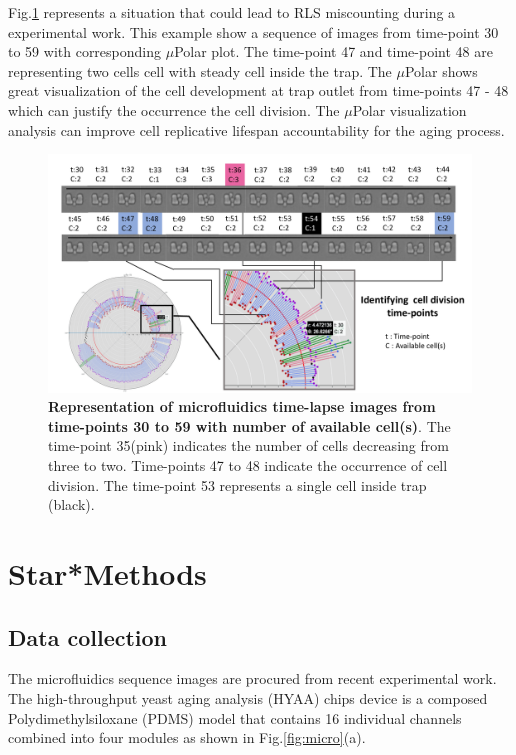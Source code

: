 \documentclass[conference]{IEEEtran}
\begin{document}
Fig.\ref{fig:division} represents a situation that could lead to RLS miscounting during a  experimental work. This example show a sequence of images from time-point 30 to 59 with corresponding $\mu$Polar plot. The time-point 47 and time-point 48 are representing two cells cell with steady cell inside the trap. The $\mu$Polar shows great visualization of the cell development at trap outlet from time-points 47 - 48 which can justify the occurrence the cell division. The $\mu$Polar visualization analysis can improve cell replicative lifespan accountability for the aging process.    

\begin{figure}
\centering
\includegraphics[width=\textwidth,height=10 cm]{Patterns/division.pdf}
\caption{ \textbf{ Representation of microfluidics time-lapse images from time-points 30 to 59 with number of available cell(s)}. The time-point 35(pink) indicates the number of cells decreasing from three to two. Time-points 47 to 48 indicate the occurrence of cell division. The time-point 53 represents a single cell inside trap (black).}
\label{fig:division}
\end{figure}


\section{Star*Methods}

\subsection*{Data collection}
The microfluidics sequence images are procured from \cite{ref13} recent experimental work. The high-throughput yeast aging analysis (HYAA) chips device is a composed Polydimethylsiloxane (PDMS) model that contains 16 individual channels combined into four modules as shown in Fig.\ref{fig:micro}(a).
\end{document}
